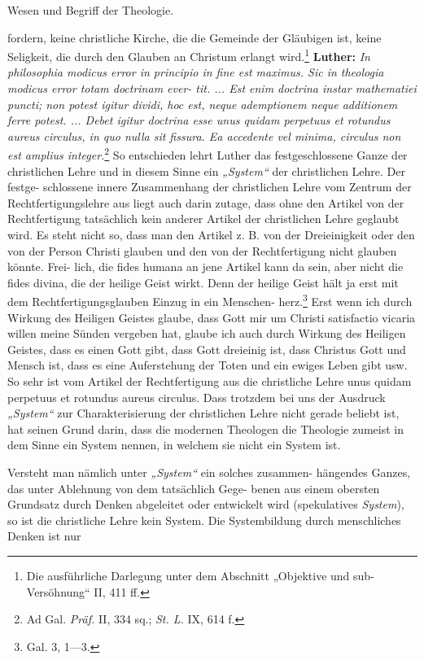 {\leavevmode{}\hfil\normalsize Wesen und Begriff der Theologie.\hfil\mbox{}}

fordern, keine christliche Kirche, die die Gemeinde der Gläubigen ist,
keine Seligkeit, die durch den Glauben an Christum erlangt wird.\footnote{Die ausführliche Darlegung unter dem Abschnitt „Objektive und sub-\njektive Versöhnung“ II, 411 ff.}
\textbf{Luther:} \emph{In philosophia modicus error in principio in fine est
maximus. Sic in theologia modicus error totam doctrinam ever-
tit. ... Est enim doctrina instar mathematiei puncti; non potest
igitur dividi, hoc est, neque ademptionem neque additionem ferre
potest. ... Debet igitur doctrina esse unus quidam perpetuus et
rotundus aureus circulus, in quo nulla sit fissura. Ea accedente
vel minima, circulus non est amplius integer.}\footnote{Ad Gal. \emph{Präf.} II, 334 sq.; \emph{St. L.} IX, 614 f.} So entschieden
lehrt Luther das festgeschlossene Ganze der christlichen Lehre und in
diesem Sinne ein \emph{„System“} der christlichen Lehre. Der festge-
schlossene innere Zusammenhang der christlichen Lehre vom Zentrum
der Rechtfertigungslehre aus liegt auch darin zutage, dass ohne den
Artikel von der Rechtfertigung tatsächlich kein anderer Artikel der
christlichen Lehre geglaubt wird. Es steht nicht so, dass man den
Artikel z. B. von der Dreieinigkeit oder den von der Person Christi
glauben und den von der Rechtfertigung nicht glauben könnte. Frei-
lich, die fides humana an jene Artikel kann da sein, aber nicht die
fides divina, die der heilige Geist wirkt. Denn der heilige Geist
hält ja erst mit dem Rechtfertigungsglauben Einzug in ein Menschen-
herz.\footnote{Gal. 3, 1—3.} Erst wenn ich durch Wirkung des Heiligen Geistes glaube,
dass Gott mir um Christi satisfactio vicaria willen meine Sünden
vergeben hat, glaube ich auch durch Wirkung des Heiligen Geistes,
dass es einen Gott gibt, dass Gott dreieinig ist, dass Christus Gott
und Mensch ist, dass es eine Auferstehung der Toten und ein ewiges
Leben gibt usw. So sehr ist vom Artikel der Rechtfertigung aus die
christliche Lehre unus quidam perpetuus et rotundus aureus circulus.
Dass trotzdem bei uns der Ausdruck \emph{„System“} zur Charakterisierung
der christlichen Lehre nicht gerade beliebt ist, hat seinen Grund darin,
dass die modernen Theologen die Theologie zumeist in dem Sinne
ein System nennen, in welchem sie nicht ein System ist.

Versteht man nämlich unter \emph{„System“} ein solches zusammen-
hängendes Ganzes, das unter Ablehnung von dem tatsächlich Gege-
benen aus einem obersten Grundsatz durch Denken abgeleitet
oder entwickelt wird (spekulatives \emph{System}), so ist die christliche Lehre
kein System. Die Systembildung durch menschliches Denken ist nur